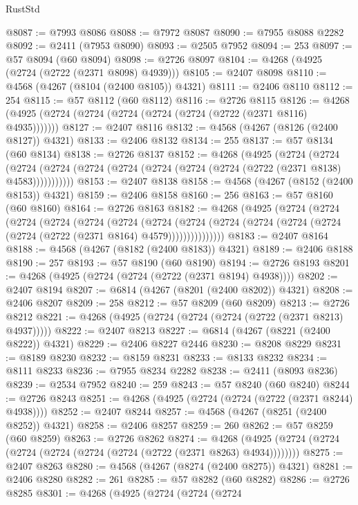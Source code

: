 \begin{lexlean}{RustStd}
\begin{coremodule}
@8087 := @7993 @8086
@8088 := @7972 @8087
@8090 := @7955 @8088 @2282
@8092 := @2411 (@7953 @8090)
@8093 := @2505 @7952
@8094 := 253
@8097 := @57 @8094 (@60 @8094)
@8098 := @2726 @8097
@8104 := @4268 (@4925 (@2724 (@2722 (@2371 @8098) @4939)))
@8105 := @2407 @8098
@8110 := @4568 (@4267 (@8104 (@2400 @8105)) @4321)
@8111 := @2406 @8110
@8112 := 254
@8115 := @57 @8112 (@60 @8112)
@8116 := @2726 @8115
@8126 := @4268 (@4925 (@2724 (@2724 (@2724 (@2724 (@2724 (@2722 (@2371 @8116) @4935)))))))
@8127 := @2407 @8116
@8132 := @4568 (@4267 (@8126 (@2400 @8127)) @4321)
@8133 := @2406 @8132
@8134 := 255
@8137 := @57 @8134 (@60 @8134)
@8138 := @2726 @8137
@8152 := @4268
    (@4925
      (@2724
        (@2724
          (@2724 (@2724 (@2724 (@2724 (@2724 (@2724 (@2724 (@2722 (@2371 @8138) @4583)))))))))))
@8153 := @2407 @8138
@8158 := @4568 (@4267 (@8152 (@2400 @8153)) @4321)
@8159 := @2406 @8158
@8160 := 256
@8163 := @57 @8160 (@60 @8160)
@8164 := @2726 @8163
@8182 := @4268
    (@4925
      (@2724
        (@2724
          (@2724
            (@2724
              (@2724
                (@2724
                  (@2724
                    (@2724
                      (@2724 (@2724 (@2724 (@2724 (@2724 (@2722 (@2371 @8164) @4579)))))))))))))))
@8183 := @2407 @8164
@8188 := @4568 (@4267 (@8182 (@2400 @8183)) @4321)
@8189 := @2406 @8188
@8190 := 257
@8193 := @57 @8190 (@60 @8190)
@8194 := @2726 @8193
@8201 := @4268 (@4925 (@2724 (@2724 (@2722 (@2371 @8194) @4938))))
@8202 := @2407 @8194
@8207 := @6814 (@4267 (@8201 (@2400 @8202)) @4321)
@8208 := @2406 @8207
@8209 := 258
@8212 := @57 @8209 (@60 @8209)
@8213 := @2726 @8212
@8221 := @4268 (@4925 (@2724 (@2724 (@2724 (@2722 (@2371 @8213) @4937)))))
@8222 := @2407 @8213
@8227 := @6814 (@4267 (@8221 (@2400 @8222)) @4321)
@8229 := @2406 @8227 @2446
@8230 := @8208 @8229
@8231 := @8189 @8230
@8232 := @8159 @8231
@8233 := @8133 @8232
@8234 := @8111 @8233
@8236 := @7955 @8234 @2282
@8238 := @2411 (@8093 @8236)
@8239 := @2534 @7952
@8240 := 259
@8243 := @57 @8240 (@60 @8240)
@8244 := @2726 @8243
@8251 := @4268 (@4925 (@2724 (@2724 (@2722 (@2371 @8244) @4938))))
@8252 := @2407 @8244
@8257 := @4568 (@4267 (@8251 (@2400 @8252)) @4321)
@8258 := @2406 @8257
@8259 := 260
@8262 := @57 @8259 (@60 @8259)
@8263 := @2726 @8262
@8274 := @4268 (@4925 (@2724 (@2724 (@2724 (@2724 (@2724 (@2724 (@2722 (@2371 @8263) @4934))))))))
@8275 := @2407 @8263
@8280 := @4568 (@4267 (@8274 (@2400 @8275)) @4321)
@8281 := @2406 @8280
@8282 := 261
@8285 := @57 @8282 (@60 @8282)
@8286 := @2726 @8285
@8301 := @4268
    (@4925
      (@2724
        (@2724
          (@2724

\end{coremodule}
\end{lexlean}
